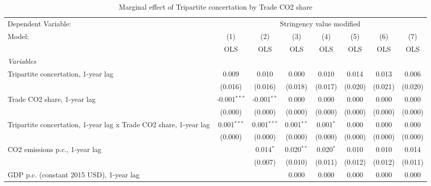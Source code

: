 
\begin{table}[htbp]
   \caption{Marginal effect of Tripartite concertation by Trade CO2 share}
   \centering
   \begin{tabular}{lccccccc}
      \toprule
      Dependent Variable: & \multicolumn{7}{c}{Stringency value modified}\\
      Model:                                                            & (1)            & (2)           & (3)          & (4)         & (5)     & (6)     & (7)\\  
                                                                        &  OLS           & OLS           & OLS          & OLS         & OLS     & OLS     & OLS\\  
      \midrule
      \emph{Variables}\\
      Tripartite concertation, 1-year lag                               & 0.009          & 0.010         & 0.000        & 0.010       & 0.014   & 0.013   & 0.006\\   
                                                                        & (0.016)        & (0.016)       & (0.018)      & (0.017)     & (0.020) & (0.021) & (0.020)\\   
      Trade CO2 share, 1-year lag                                       & -0.001$^{***}$ & -0.001$^{**}$ & 0.000        & 0.000       & 0.000   & 0.000   & 0.000\\   
                                                                        & (0.000)        & (0.000)       & (0.000)      & (0.000)     & (0.000) & (0.000) & (0.000)\\   
      Tripartite concertation, 1-year lag x Trade CO2 share, 1-year lag & 0.001$^{***}$  & 0.001$^{***}$ & 0.001$^{**}$ & 0.001$^{*}$ & 0.000   & 0.000   & 0.000\\   
                                                                        & (0.000)        & (0.000)       & (0.000)      & (0.000)     & (0.000) & (0.000) & (0.000)\\   
      CO2 emissions p.c., 1-year lag                                    &                & 0.014$^{*}$   & 0.020$^{**}$ & 0.020$^{*}$ & 0.010   & 0.010   & 0.014\\   
                                                                        &                & (0.007)       & (0.010)      & (0.011)     & (0.012) & (0.012) & (0.011)\\   
      GDP p.c. (constant 2015 USD), 1-year lag                          &                &               & 0.000        & 0.000       & 0.000   & 0.000   & 0.000\\   

\end{tabular}
\end{table}
